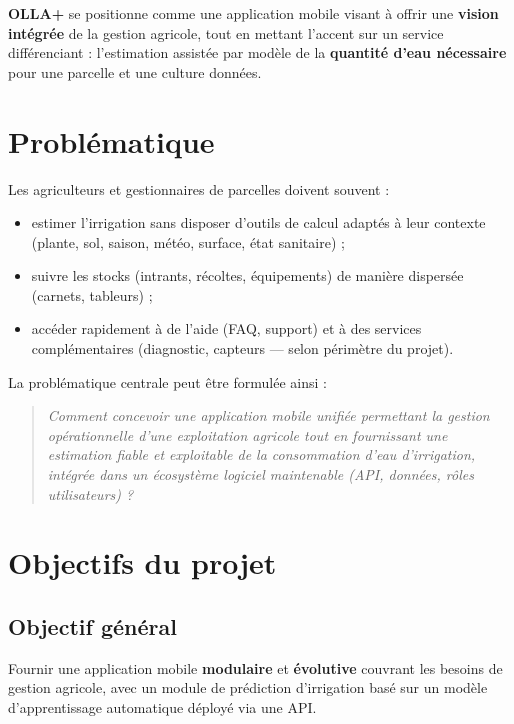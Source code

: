 \documentclass[12pt,a4paper,twoside,openright]{report}
\begin{document}
\textbf{OLLA+} se positionne comme une application mobile visant à offrir une \textbf{vision intégrée} de la gestion agricole, tout en mettant l'accent sur un service différenciant : l'estimation assistée par modèle de la \textbf{quantité d'eau nécessaire} pour une parcelle et une culture données.

\section{Problématique}

Les agriculteurs et gestionnaires de parcelles doivent souvent :
\begin{itemize}
  \item estimer l'irrigation sans disposer d'outils de calcul adaptés à leur contexte (plante, sol, saison, météo, surface, état sanitaire) ;
  \item suivre les stocks (intrants, récoltes, équipements) de manière dispersée (carnets, tableurs) ;
  \item accéder rapidement à de l'aide (FAQ, support) et à des services complémentaires (diagnostic, capteurs — selon périmètre du projet).
\end{itemize}

La problématique centrale peut être formulée ainsi :

\begin{quote}
\textit{Comment concevoir une application mobile unifiée permettant la gestion opérationnelle d'une exploitation agricole tout en fournissant une estimation fiable et exploitable de la consommation d'eau d'irrigation, intégrée dans un écosystème logiciel maintenable (API, données, rôles utilisateurs) ?}
\end{quote}

\section{Objectifs du projet}

\subsection{Objectif général}
Fournir une application mobile \textbf{modulaire} et \textbf{évolutive} couvrant les besoins de gestion agricole, avec un module de prédiction d'irrigation basé sur un modèle d'apprentissage automatique déployé via une API.
\end{document}
